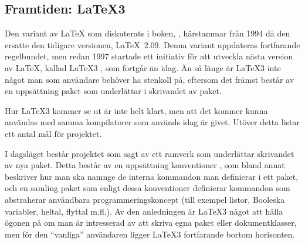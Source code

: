 \documentclass[10pt,../../a4.tex]{subfiles}
\begin{document}
\subsection{Framtiden: \LaTeX3}
Den variant av \LaTeX{} som diskuterats i boken, \LaTeXe{}, härstammar
från 1994 då den ersatte den tidigare versionen, \LaTeX~2.09. Denna
variant uppdateras fortfarande regelbundet, men redan 1997 startade ett
initiativ för att utveckla nästa version av \LaTeX, kallad \LaTeX3
\parencite{Rowley99}, som fortgår än idag. Än så länge är \LaTeX3 inte
något man som användare behöver ha stenkoll på, eftersom det främst
består av en uppsättning paket som underlättar i skrivandet av paket.

Hur \LaTeX3 kommer se ut är inte helt klart, men att det kommer kunna
användas med samma kompilatorer som används idag är givet. Utöver detta
listar \textcite[4\psq]{Rowley99} ett antal mål för projektet.

I dagsläget består projektet som sagt av ett ramverk som underlättar
skrivandet av nya paket. Detta består av en uppsättning konventioner
\parencite{expl3}, som bland annat beskriver hur man ska namnge de
interna kommandon man definierar i ett paket, och en samling paket
\parencite{interface3} som enligt dessa konventioner definierar
kommandon som abstraherar användbara programmeringskoncept (till
exempel listor, Booleska variabler, heltal, flyttal m.fl.).
Av den anledningen är \LaTeX3 något att hålla ögonen på om man är
intresserad av att skriva egna paket eller dokumentklasser, men för
den \enquote{vanliga} användaren ligger \LaTeX3 fortfarande bortom
horisonten.
\end{document}
